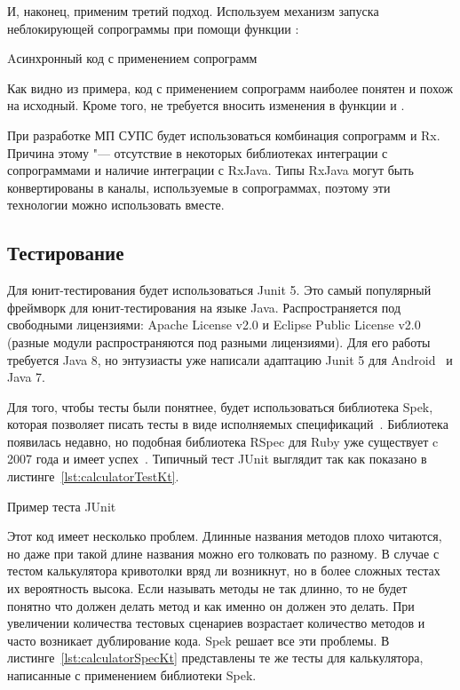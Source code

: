 И, наконец, применим третий подход.
Используем механизм запуска неблокирующей сопрограммы при помощи функции :

\begin{listing}[H]
  \caption{Aсинхронный код с применением сопрограмм}
  \label{lst:asyncKtCoroutines}
\end{listing}

Как видно из примера, код с применением сопрограмм наиболее понятен и похож на исходный.
Кроме того, не требуется вносить изменения в функции  и .

При разработке МП СУПС будет использоваться комбинация сопрограмм и Rx.
Причина этому "--- отсутствие в некоторых библиотеках интеграции с сопрограммами и наличие интеграции с RxJava.
Типы RxJava могут быть конвертированы в каналы, используемые в сопрограммах, поэтому эти технологии можно использовать вместе.

\subsection{Тестирование}
\label{subsec:testing}
Для юнит-тестирования будет использоваться Junit 5.
Это самый популярный фреймворк для юнит-тестирования на языке Java.
Распространяется под свободными лицензиями: Apache License v2.0 и Eclipse Public License v2.0 (разные модули распространяются под разными лицензиями).
Для его работы требуется Java 8, но энтузиасты уже написали адаптацию Junit 5 для Android~\cite{gihub:junit5Android} и Java 7.

Для того, чтобы тесты были понятнее, будет использоваться библиотека Spek, которая позволяет писать тесты в виде исполняемых спецификаций~\cite{spek:docs}.
Библиотека появилась недавно, но подобная библиотека RSpec для Ruby уже существует c 2007 года и имеет успех~\cite{rspec:about}.
Типичный тест JUnit выглядит так как показано в листинге~\ref{lst:calculatorTestKt}.

\begin{listing}[H]
  \caption{Пример теста JUnit}
  \label{lst:calculatorTestKt}
\end{listing}

Этот код имеет несколько проблем.
Длинные названия методов плохо читаются, но даже при такой длине названия можно его толковать по разному.
В случае с тестом калькулятора кривотолки вряд ли возникнут, но в более сложных тестах их вероятность высока.
Если называть методы не так длинно, то не будет понятно что должен делать метод и как именно он должен это делать.
При увеличении количества тестовых сценариев возрастает количество методов и часто возникает дублирование кода.
Spek решает все эти проблемы.
В листинге~\ref{lst:calculatorSpecKt} представлены те же тесты для калькулятора, написанные с применением библиотеки Spek.\\

